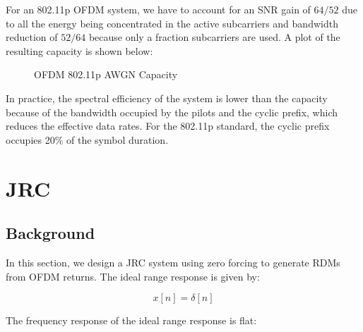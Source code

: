 \documentclass[conference]{IEEEtran}
\begin{document}
	    For an 802.11p OFDM system, we have to account for an SNR gain of $64/52$ due to all the energy being concentrated in the active subcarriers and bandwidth reduction of $52/64$ because only a fraction subcarriers are used. A plot of the resulting capacity is shown below:
	    
	    \begin{figure}[H]
	    		\centering
    			\caption{OFDM 802.11p AWGN Capacity}
    			\label{fig::ofdm_awgn_capacity}
	    \end{figure}
	    
	   	In practice, the spectral efficiency of the system is lower than the capacity because of the bandwidth occupied by the pilots and the cyclic prefix, which reduces the effective data rates. For the 802.11p standard, the cyclic prefix occupies 20\% of the symbol duration.
    
    \section {JRC}
		\subsection {Background}

		In this section, we design a JRC system using zero forcing to generate RDMs from OFDM returns. The ideal range response is given by:
		
		\begin{equation}
			x[n] = \delta[n]
		\end{equation}
		
		The frequency response of the ideal range response is flat:
		
\end{document}
